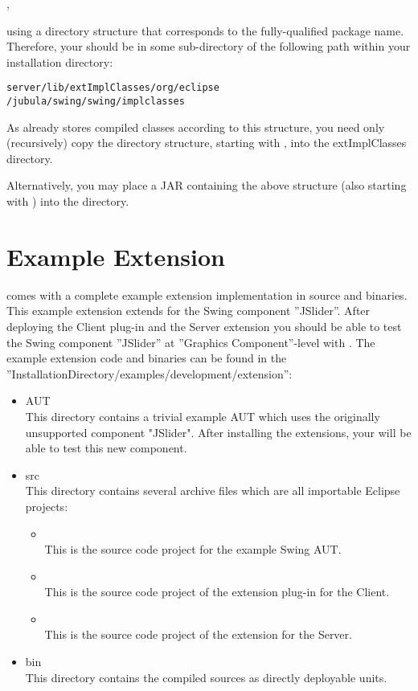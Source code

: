  ,

using a directory structure that corresponds to the fully-qualified
package name. Therefore, your \gdtesterclasses should be in some
sub-directory of the following path within your \app{} installation directory:

\texttt{server/lib/extImplClasses/org/eclipse\\
    /jubula/swing/swing/implclasses}

As  already stores compiled classes according to this
structure, you need only (recursively) copy the directory structure,
starting with , into the extImplClasses directory.

Alternatively, you may place a JAR containing the above structure
(also starting with ) into the 
directory.


\section{\app{} Example Extension}
\app{} comes with a complete example extension implementation in source and binaries. 
This example extension extends \app{} for the Swing component ''JSlider''. After deploying the \app{} Client plug-in and the \app{} Server 
extension you should be able to test the Swing component ''JSlider'' at ''Graphics Component''-level with \app{}.
The example extension code and binaries can be found in the ''InstallationDirectory/examples/development/extension'':

\begin{itemize}
 \item AUT \\
 This directory contains a trivial example AUT which uses the originally unsupported component "JSlider". 
 After installing the extensions, your \app{} will be able to test this new component.
 \item src \\
 This directory contains several archive files which are all importable Eclipse projects:
 \begin{itemize}
 	\item {} \\
 	This is the source code project for the example Swing AUT.
 	\item {} \\
 	This is the source code project of the extension plug-in for the \app{} Client.
 	\item {} \\
 	This is the source code project of the extension for the \app{} Server.
 \end{itemize}
 \item bin \\
 This directory contains the compiled sources as directly deployable units.
\end{itemize}
